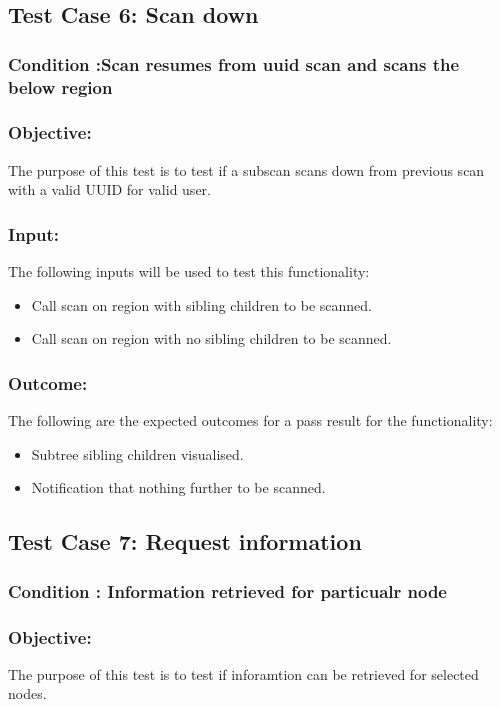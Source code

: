 \documentclass[hidelinks,a4paper,12pt]{article}
\begin{document}
\subsection{Test Case 6: Scan down }
\subsubsection{Condition :Scan resumes from uuid scan and scans the below region}
\subsubsection{Objective:} The purpose of this test is to test if a subscan scans down from previous scan with a valid UUID for valid user.

\subsubsection{Input:}
 The following inputs will be used to test this functionality:
\begin{itemize}
  \item Call scan on region with sibling children to be scanned.
   \item Call scan on region with no  sibling children to be scanned.

\end{itemize}

\subsubsection{Outcome: }
The following are the expected outcomes for a pass result for the functionality:
\begin{itemize}
\item Subtree  sibling children visualised.
\item Notification that nothing further to be scanned.

\end{itemize}

\subsection{Test Case 7: Request information }
\subsubsection{Condition : Information retrieved for particualr node}
\subsubsection{Objective:} The purpose of this test is to test if inforamtion can be retrieved for selected nodes.
\end{document}
